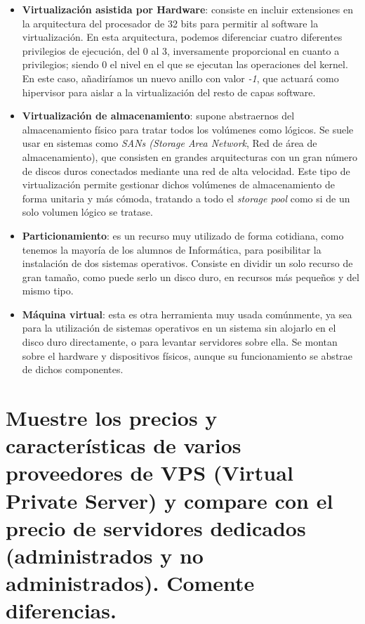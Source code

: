\begin{itemize}
	\item \textbf{Virtualización asistida por Hardware}: consiste en incluir extensiones en la arquitectura del procesador de 32 bits para permitir al software
	la virtualización. En esta arquitectura, podemos diferenciar cuatro diferentes privilegios de ejecución, del 0 al 3, inversamente proporcional en cuanto a
	privilegios; siendo 0 el nivel en el que se ejecutan las operaciones del kernel. En este caso, añadiríamos un nuevo anillo con valor \emph{-1}, que actuará
	como hipervisor para aislar a la virtualización del resto de capas software.
		
	\item \textbf{Virtualización de almacenamiento}: supone abstraernos del almacenamiento físico para tratar todos los volúmenes como lógicos. Se suele usar en
	sistemas como \emph{SANs (Storage Area Network}, Red de área de almacenamiento), que consisten en grandes arquitecturas con un gran número de discos duros
	conectados mediante una red de alta velocidad. Este tipo de virtualización permite gestionar dichos volúmenes de almacenamiento de forma unitaria y más cómoda,
	tratando a todo el \emph{storage pool} como si de un solo volumen lógico se tratase.
	
	\item \textbf{Particionamiento}: es un recurso muy utilizado de forma cotidiana, como tenemos la mayoría de los alumnos de Informática, para posibilitar la 
	instalación de dos sistemas operativos. Consiste en dividir un solo recurso de gran tamaño, como puede serlo un disco duro, en recursos más pequeños y del 
	mismo tipo.
	
	\item \textbf{Máquina virtual}: esta es otra herramienta muy usada comúnmente, ya sea para la utilización de sistemas operativos en un sistema sin alojarlo
	en el disco duro directamente, o para levantar servidores sobre ella. Se montan sobre el hardware y dispositivos físicos, aunque su funcionamiento se abstrae
	de dichos componentes.
\end{itemize}


\section{Muestre los precios y características de varios proveedores de VPS (Virtual Private Server) y compare con el precio de servidores
	dedicados (administrados y no administrados). Comente diferencias.}


